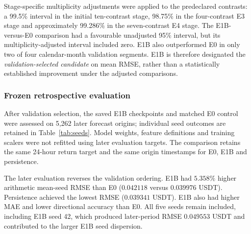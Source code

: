 Stage-specific multiplicity adjustments were applied to the predeclared contrasts: a 99.5\% interval in the initial ten-contrast stage, 98.75\% in the four-contrast E3 stage and approximately 99.286\% in the seven-contrast E4 stage. The E1B-versus-E0 comparison had a favourable unadjusted 95\% interval, but its multiplicity-adjusted interval included zero. E1B also outperformed E0 in only two of four calendar-month validation segments. E1B is therefore designated the \emph{validation-selected candidate} on mean RMSE, rather than a statistically established improvement under the adjusted comparisons.

\subsubsection{Frozen retrospective evaluation}

After validation selection, the saved E1B checkpoints and matched E0 control were assessed on 5,262 later forecast origins; individual seed outcomes are retained in Table~\ref{tab:seeds}. Model weights, feature definitions and training scalers were not refitted using later evaluation targets. The comparison retains the same 24-hour return target and the same origin timestamps for E0, E1B and persistence.

\begin{table}[!htbp]
\centering\small
\caption{Later reserved retrospective XRP evaluation on 5,262 identical origins. Neural values are arithmetic means across five saved seeds; SD reflects seed variability. All RMSE and MAE values are in USDT.}
\label{tab:final}
\end{table}

The later evaluation reverses the validation ordering. E1B had $5.358\%$ higher arithmetic mean-seed RMSE than E0 ($0.042118$ versus $0.039976$ USDT). Persistence achieved the lowest RMSE ($0.039341$ USDT). E1B also had higher MAE and lower directional accuracy than E0. All five seeds remain included, including E1B seed 42, which produced later-period RMSE $0.049553$ USDT and contributed to the larger E1B seed dispersion.

